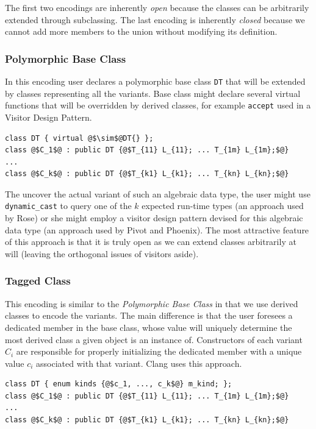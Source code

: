 \documentclass[preprint]{sigplanconf}
\makeatletter
\DeclareRobustCommand{\code}[1]{{\lstinline[breaklines=false,escapechar=@]{#1}}}
\makeatother
\begin{document}
The first two encodings are inherently \emph{open} because the classes can be 
arbitrarily extended through subclassing. The last encoding is inherently 
\emph{closed} because we cannot add more members to the union without modifying 
its definition.

\subsubsection{Polymorphic Base Class}
\label{sec:pbc}

In this encoding user declares a polymorphic base class \code{DT} that will 
be extended by classes representing all the variants. Base class might declare 
several virtual functions that will be overridden by derived classes, for example 
\code{accept} used in a Visitor Design Pattern.

\begin{lstlisting}[keepspaces,columns=flexible]
class DT { virtual @$\sim$@DT{} };
class @$C_1$@ : public DT {@$T_{11} L_{11}; ... T_{1m} L_{1m};$@} 
...
class @$C_k$@ : public DT {@$T_{k1} L_{k1}; ... T_{kn} L_{kn};$@} 
\end{lstlisting}

The uncover the actual variant of such an algebraic data type, the user might 
use \code{dynamic_cast} to query one of the $k$ expected run-time types (an 
approach used by Rose\cite{SQ03}) or she might employ a visitor design pattern 
devised for this algebraic data type (an approach used by Pivot\cite{Pivot09} 
and Phoenix\cite{Phoenix}). The most attractive feature of this approach is that 
it is truly open as we can extend classes arbitrarily at will (leaving the 
orthogonal issues of visitors aside).

\subsubsection{Tagged Class}
\label{sec:tc}

This encoding is similar to the \emph{Polymorphic Base Class} in that we use 
derived classes to encode the variants. The main difference is that the user 
foresees a dedicated member in the base class, whose value will uniquely 
determine the most derived class a given object is an instance of. Constructors 
of each variant $C_i$ are responsible for properly initializing the dedicated 
member with a unique value $c_i$ associated with that variant. Clang\cite{Clang} 
uses this approach.

\begin{lstlisting}[keepspaces,columns=flexible]
class DT { enum kinds {@$c_1, ..., c_k$@} m_kind; };
class @$C_1$@ : public DT {@$T_{11} L_{11}; ... T_{1m} L_{1m};$@} 
...
class @$C_k$@ : public DT {@$T_{k1} L_{k1}; ... T_{kn} L_{kn};$@} 
\end{lstlisting}
\end{document}
